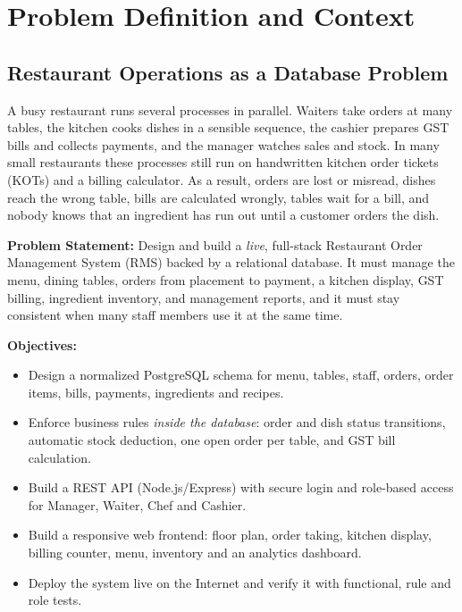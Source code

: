 \documentclass[11pt,a4paper]{report}
\begin{document}

\tableofcontents
\newpage


\section{Problem Definition and Context}

\subsection{Restaurant Operations as a Database Problem}
A busy restaurant runs several processes in parallel. Waiters take orders at many tables, the kitchen cooks dishes in a sensible sequence, the cashier prepares GST bills and collects payments, and the manager watches sales and stock. In many small restaurants these processes still run on handwritten kitchen order tickets (KOTs) and a billing calculator. As a result, orders are lost or misread, dishes reach the wrong table, bills are calculated wrongly, tables wait for a bill, and nobody knows that an ingredient has run out until a customer orders the dish.

\textbf{Problem Statement:} Design and build a \emph{live}, full-stack Restaurant Order Management System (RMS) backed by a relational database. It must manage the menu, dining tables, orders from placement to payment, a kitchen display, GST billing, ingredient inventory, and management reports, and it must stay consistent when many staff members use it at the same time.

\textbf{Objectives:}
\begin{itemize}
    \item Design a normalized PostgreSQL schema for menu, tables, staff, orders, order items, bills, payments, ingredients and recipes.
    \item Enforce business rules \emph{inside the database}: order and dish status transitions, automatic stock deduction, one open order per table, and GST bill calculation.
    \item Build a REST API (Node.js/Express) with secure login and role-based access for Manager, Waiter, Chef and Cashier.
    \item Build a responsive web frontend: floor plan, order taking, kitchen display, billing counter, menu, inventory and an analytics dashboard.
    \item Deploy the system live on the Internet and verify it with functional, rule and role tests.
\end{itemize}
\end{document}
